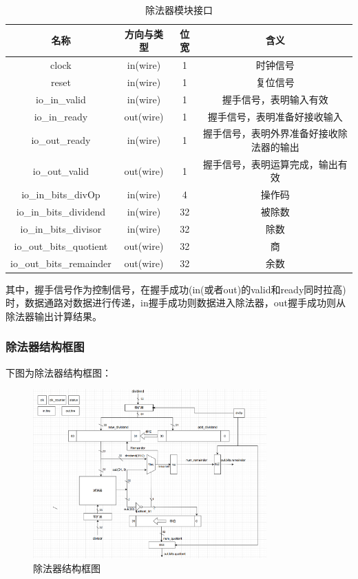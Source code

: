 \documentclass[11pt]{article}
\begin{document}
\begin{table}[H]
    \centering
    \begin{tabular}{cccc}\hline
        名称                  & 方向与类型 & 位宽 & 含义                                    \\ \hline
        clock                 & in(wire)   & 1    & 时钟信号                                \\
        reset                 & in(wire)   & 1    & 复位信号                                \\ \hline
        io_in_valid           & in(wire)   & 1    & 握手信号，表明输入有效                  \\
        io_in_ready           & out(wire)  & 1    & 握手信号，表明准备好接收输入            \\
        io_out_ready          & in(wire)   & 1    & 握手信号，表明外界准备好接收除法器的输出\\
        io_out_valid          & out(wire)  & 1    & 握手信号，表明运算完成，输出有效        \\ \hline
        io_in_bits_divOp      & in(wire)   & 4    & 操作码                            \\
        io_in_bits_dividend   & in(wire)   & 32   & 被除数                                  \\
        io_in_bits_divisor    & in(wire)   & 32   & 除数                                    \\
        io_out_bits_quotient  & out(wire)  & 32   & 商                                      \\
        io_out_bits_remainder & out(wire)  & 32   & 余数                                    \\ \hline
    \end{tabular}
    \caption{除法器模块接口}
\end{table}

其中，握手信号作为控制信号，在握手成功(in(或者out)的valid和ready同时拉高)时，数据通路对数据进行传递，in握手成功则数据进入除法器，out握手成功则从除法器输出计算结果。

\subsubsection{除法器结构框图}
下图为除法器结构框图：
\begin{figure}[H]
    \centering
    \includegraphics[width=0.8\textwidth]{fig/取法器.png}
    \caption{除法器结构框图}
\end{figure}
\end{document}
